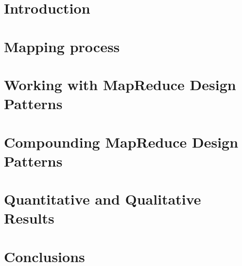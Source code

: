 \documentclass[preprint,12pt]{elsarticle}
\theoremstyle{plain}
\theoremstyle{plain}
\theoremstyle{plain}
\theoremstyle{plain}
\begin{document}
\section{Introduction}\label{sec:intro}


\section{Mapping process}\label{sec:mappingprocess}
 

\section{Working with MapReduce Design Patterns}\label{sec:case-study}
 

\section{Compounding MapReduce Design Patterns}\label{sec:composition}


\section{Quantitative and Qualitative Results}\label{sec:lessons-learned}


\section{Conclusions}\label{sec:conclusions}

 


\end{document}
